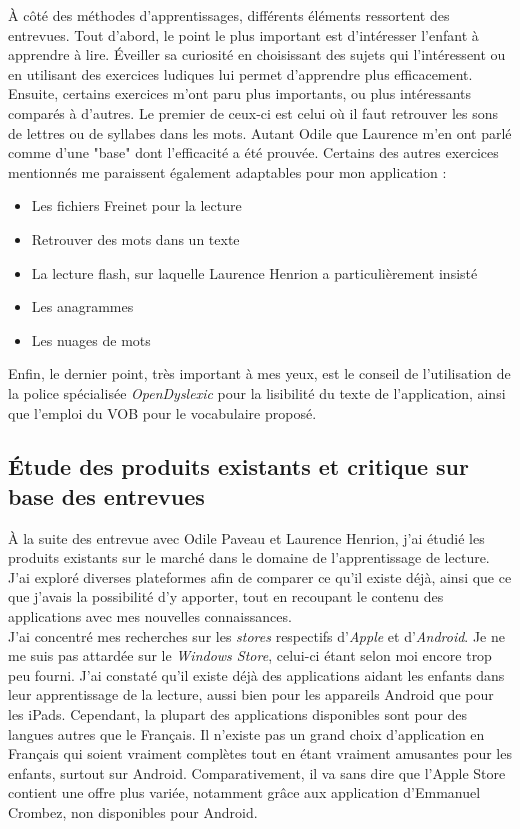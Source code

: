 À côté des méthodes d'apprentissages, différents éléments ressortent des entrevues. Tout d'abord, le point le plus important est d'intéresser l'enfant à apprendre à lire. Éveiller sa curiosité en choisissant des sujets qui l'intéressent ou en utilisant des exercices ludiques lui permet d'apprendre plus efficacement.\\

Ensuite, certains exercices m'ont paru plus importants, ou plus intéressants comparés à d'autres. Le premier de ceux-ci est celui où il faut retrouver les sons de lettres ou de syllabes dans les mots. Autant Odile que Laurence m'en ont parlé comme d'une "base" dont l'efficacité a été prouvée.
Certains des autres exercices mentionnés me paraissent également adaptables pour mon application :
\begin{itemize}
\item Les fichiers Freinet pour la lecture
\item Retrouver des mots dans un texte
\item La lecture flash, sur laquelle Laurence Henrion a particulièrement insisté
\item Les anagrammes
\item Les nuages de mots\\
\end{itemize}

Enfin, le dernier point, très important à mes yeux, est le conseil de l'utilisation de la police spécialisée \textit{OpenDyslexic} pour la lisibilité du texte de l'application, ainsi que l'emploi du VOB pour le vocabulaire proposé.

\subsection{Étude des produits existants et critique sur base des entrevues}
À la suite des entrevue avec Odile Paveau et Laurence Henrion, j'ai étudié les produits existants sur le marché dans le domaine de l'apprentissage de lecture. J'ai exploré diverses plateformes afin de comparer ce qu'il existe déjà, ainsi que ce que j'avais la possibilité d'y apporter, tout en recoupant le contenu des applications avec mes nouvelles connaissances.\\

J'ai concentré mes recherches sur les \textit{stores} respectifs d'\textit{Apple} et d'\textit{Android}. Je ne me suis pas attardée sur le \textit{Windows Store}, celui-ci étant selon moi encore trop peu fourni. J'ai constaté qu'il existe déjà des applications aidant les enfants dans leur apprentissage de la lecture, aussi bien pour les appareils Android que pour les iPads. Cependant, la plupart des applications disponibles sont pour des langues autres que le Français. Il n'existe pas un grand choix d'application en Français qui soient vraiment complètes tout en étant vraiment amusantes pour les enfants, surtout sur Android. Comparativement, il va sans dire que l'Apple Store contient une offre plus variée, notamment grâce aux application d'Emmanuel Crombez, non disponibles pour Android.\\

